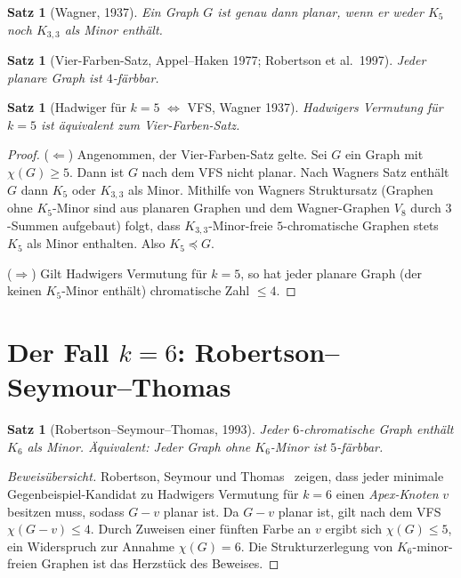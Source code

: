 \documentclass[12pt,a4paper]{amsart}
\newtheorem{satz}[theorem]{Satz}
\theoremstyle{definition}
\theoremstyle{remark}
\begin{document}
\begin{satz}[Wagner, 1937]\label{satz:wagner}
Ein Graph $G$ ist genau dann planar, wenn er weder $K_5$ noch $K_{3,3}$ als Minor enthält.
\end{satz}

\begin{satz}[Vier-Farben-Satz, Appel--Haken 1977; Robertson et al.\ 1997]\label{satz:VFS}
Jeder planare Graph ist $4$-färbbar.
\end{satz}

\begin{satz}[Hadwiger für $k = 5$ $\Leftrightarrow$ VFS, Wagner 1937]\label{satz:k5}
Hadwigers Vermutung für $k = 5$ ist äquivalent zum Vier-Farben-Satz.
\end{satz}

\begin{proof}
($\Leftarrow$) Angenommen, der Vier-Farben-Satz gelte. Sei $G$ ein Graph mit
$\chi(G) \geq 5$. Dann ist $G$ nach dem VFS nicht planar. Nach Wagners Satz enthält
$G$ dann $K_5$ oder $K_{3,3}$ als Minor. Mithilfe von Wagners Struktursatz
(Graphen ohne $K_5$-Minor sind aus planaren Graphen und dem Wagner-Graphen $V_8$
durch $3$-Summen aufgebaut) folgt, dass $K_{3,3}$-Minor-freie $5$-chromatische Graphen
stets $K_5$ als Minor enthalten. Also $K_5 \preceq G$.

($\Rightarrow$) Gilt Hadwigers Vermutung für $k = 5$, so hat jeder planare Graph
(der keinen $K_5$-Minor enthält) chromatische Zahl $\leq 4$.
\end{proof}

\section{Der Fall \texorpdfstring{$k = 6$}{k=6}: Robertson--Seymour--Thomas}

\begin{satz}[Robertson--Seymour--Thomas, 1993]\label{satz:k6}
Jeder $6$-chromatische Graph enthält $K_6$ als Minor. Äquivalent: Jeder Graph
ohne $K_6$-Minor ist $5$-färbbar.
\end{satz}

\begin{proof}[Beweisübersicht]
Robertson, Seymour und Thomas~\cite{RST93} zeigen, dass jeder minimale Gegenbeispiel-Kandidat
zu Hadwigers Vermutung für $k = 6$ einen \emph{Apex-Knoten} $v$ besitzen muss, sodass
$G - v$ planar ist. Da $G - v$ planar ist, gilt nach dem VFS $\chi(G - v) \leq 4$.
Durch Zuweisen einer fünften Farbe an $v$ ergibt sich $\chi(G) \leq 5$, ein Widerspruch
zur Annahme $\chi(G) = 6$. Die Strukturzerlegung von $K_6$-minor-freien Graphen
ist das Herzstück des Beweises.
\end{proof}
\end{document}
